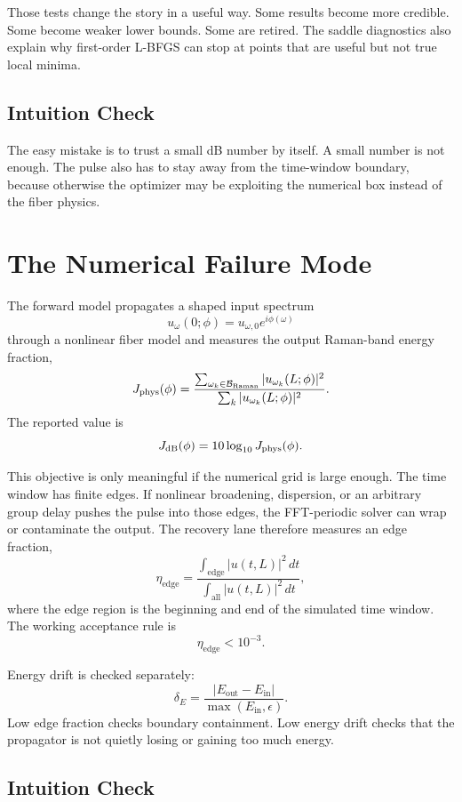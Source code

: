 \documentclass[11pt]{article}
\begin{document}
Those tests change the story in a useful way. Some results become more
credible. Some become weaker lower bounds. Some are retired. The saddle
diagnostics also explain why first-order L-BFGS can stop at points that are
useful but not true local minima.

\subsection*{Intuition Check}

The easy mistake is to trust a small dB number by itself. A small number is not
enough. The pulse also has to stay away from the time-window boundary, because
otherwise the optimizer may be exploiting the numerical box instead of the
fiber physics.

\section{The Numerical Failure Mode}

The forward model propagates a shaped input spectrum
\[
    u_\omega(0;\phi)=u_{\omega,0}e^{i\phi(\omega)}
\]
through a nonlinear fiber model and measures the output Raman-band energy
fraction,
\[
    J_{\mathrm{phys}}(\phi)
    =
    \frac{\sum_{\omega_k\in\mathcal{B}_{\mathrm{Raman}}}|u_{\omega_k}(L;\phi)|^2}
         {\sum_k |u_{\omega_k}(L;\phi)|^2}.
\]
The reported value is
\[
    J_{\mathrm{dB}}(\phi)=10\log_{10}J_{\mathrm{phys}}(\phi).
\]

This objective is only meaningful if the numerical grid is large enough. The
time window has finite edges. If nonlinear broadening, dispersion, or an
arbitrary group delay pushes the pulse into those edges, the FFT-periodic
solver can wrap or contaminate the output. The recovery lane therefore measures
an edge fraction,
\[
    \eta_{\mathrm{edge}}
    =
    \frac{\int_{\mathrm{edge}} |u(t,L)|^2\,dt}
         {\int_{\mathrm{all}} |u(t,L)|^2\,dt},
\]
where the edge region is the beginning and end of the simulated time window.
The working acceptance rule is
\[
    \eta_{\mathrm{edge}} < 10^{-3}.
\]

Energy drift is checked separately:
\[
    \delta_E
    =
    \frac{\left|E_{\mathrm{out}}-E_{\mathrm{in}}\right|}
         {\max(E_{\mathrm{in}},\epsilon)}.
\]
Low edge fraction checks boundary containment. Low energy drift checks that the
propagator is not quietly losing or gaining too much energy.

\subsection*{Intuition Check}
\end{document}

